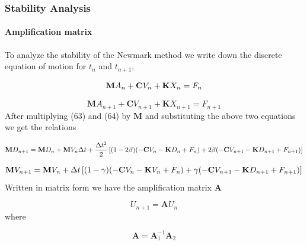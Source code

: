 \documentclass{article}
\begin{document}

	\subsubsection{Stability Analysis}

				\paragraph{Amplification matrix} To analyze the stability of the Newmark method we write down the discrete equation of motion for $t_n$ and $t_{n+1}$, 

				\begin{equation}
					\textbf{M}A_{n}+\textbf{C}V_{n}+\textbf{K}X_{n} =F_{n}\\
				\end{equation}

				\begin{equation}
					\textbf{M}A_{n+1}+\textbf{C}V_{n+1}+\textbf{K}X_{n+1} =F_{n+1}
				\end{equation}
 After multiplying (63) and (64) by $\textbf{M}$ and substituting the above two equations we get the relations

				\begin{equation*}
					\textbf{M}D_{n+1} = \textbf{M}D_{n} + \textbf{M}V_{n}\Delta t + \newline \frac{\Delta t^2}{2}\left[(1 - 2\beta)(-\textbf{C}V_n - \textbf{K}D_n + F_n) + 2\beta(-\textbf{C}V_{n+1}- \textbf{K}D_{n+1} + F_{n+1})\right]
				\end{equation*}

				\begin{equation*}
					\textbf{M}V_{n+1} = \textbf{M}V_{n} + \newline \Delta t\left[(1 - \gamma)(-\textbf{C}V_n - \textbf{K}V_n + F_n) + \gamma(-\textbf{C}V_{n+1}- \textbf{K}D_{n+1} + F_{n+1})\right]
				\end{equation*}
Written in matrix form we have the amplification matrix $\textbf{A}$
	
				\begin{equation}
					U_{n+1} = \textbf{A}U_n
				\end{equation}
where 

				\begin{equation}
					\textbf{A} = \textbf{A}_1^{-1}\textbf{A}_2
				\end{equation} \newline
\end{document}
